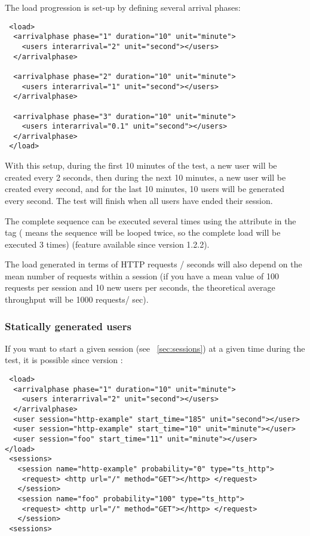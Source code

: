 \documentclass{TSUNG-en}
\begin{document}
The load progression is set-up by defining several arrival phases:

\begin{Verbatim}
 <load>
  <arrivalphase phase="1" duration="10" unit="minute">
    <users interarrival="2" unit="second"></users>
  </arrivalphase>

  <arrivalphase phase="2" duration="10" unit="minute">
    <users interarrival="1" unit="second"></users>
  </arrivalphase>

  <arrivalphase phase="3" duration="10" unit="minute">
    <users interarrival="0.1" unit="second"></users>
  </arrivalphase>
 </load>
\end{Verbatim}

With this setup, during the first 10 minutes of the test, a new user
will be created every 2 seconds, then during the next 10 minutes, a
new user will be created every second, and for the last 10 minutes,
10 users will be generated every second. The test will finish when
all users have ended their session.

The complete sequence can be executed several times using the
 attribute in the  tag
( means the sequence will be looped twice, so the
complete load will be executed 3 times) (feature available since
version 1.2.2).

The load generated in terms of HTTP requests / seconds will also
depend on the mean number of requests within a session (if you have a
mean value of 100 requests per session and 10 new users per seconds,
the theoretical average throughput will be 1000 requests/ sec).

\subsubsection{Statically generated users}

If you want to start a given session (see ~\ref{sec:sessions}) at a given time during the test,
it is possible since version :
\begin{Verbatim}
 <load>
  <arrivalphase phase="1" duration="10" unit="minute">
    <users interarrival="2" unit="second"></users>
  </arrivalphase>
  <user session="http-example" start_time="185" unit="second"></user>
  <user session="http-example" start_time="10" unit="minute"></user>
  <user session="foo" start_time="11" unit="minute"></user>
</load>
 <sessions>
   <session name="http-example" probability="0" type="ts_http">
    <request> <http url="/" method="GET"></http> </request>
   </session>
   <session name="foo" probability="100" type="ts_http">
    <request> <http url="/" method="GET"></http> </request>
   </session>
 <sessions>
\end{Verbatim}
\end{document}
